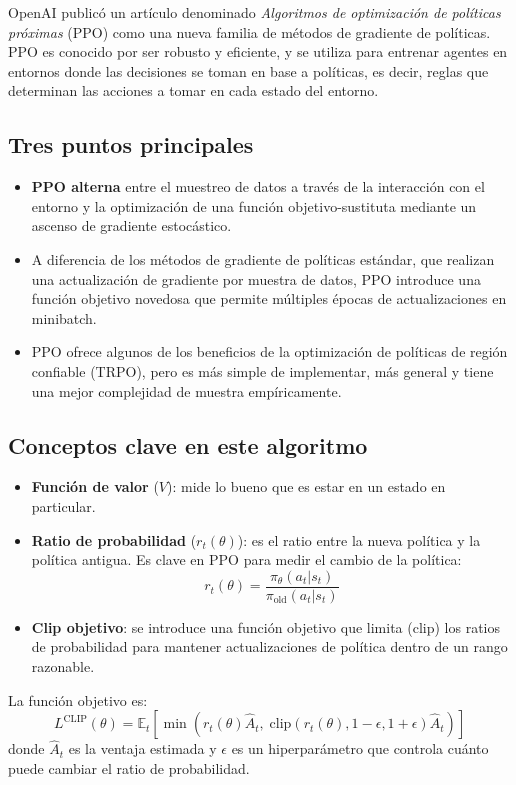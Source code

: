 OpenAI publicó un artículo denominado \textit{Algoritmos de optimización de políticas próximas} (PPO) como una nueva familia de métodos de gradiente de políticas. PPO es conocido por ser robusto y eficiente, y se utiliza para entrenar agentes en entornos donde las decisiones se toman en base a políticas, es decir, reglas que determinan las acciones a tomar en cada estado del entorno.

\subsection{Tres puntos principales}
\begin{itemize}
    \item \textbf{PPO alterna} entre el muestreo de datos a través de la interacción con el entorno y la optimización de una función objetivo-sustituta mediante un ascenso de gradiente estocástico.
    \item A diferencia de los métodos de gradiente de políticas estándar, que realizan una actualización de gradiente por muestra de datos, PPO introduce una función objetivo novedosa que permite múltiples épocas de actualizaciones en minibatch.
    \item PPO ofrece algunos de los beneficios de la optimización de políticas de región confiable (TRPO), pero es más simple de implementar, más general y tiene una mejor complejidad de muestra empíricamente.
\end{itemize}

\subsection{Conceptos clave en este algoritmo}
\begin{itemize}
    \item \textbf{Función de valor} ($V$): mide lo bueno que es estar en un estado en particular.
    \item \textbf{Ratio de probabilidad} ($r_t(\theta)$): es el ratio entre la nueva política y la política antigua. Es clave en PPO para medir el cambio de la política:
    \[
    r_t(\theta) = \frac{\pi_\theta(a_t|s_t)}{\pi_{\text{old}}(a_t|s_t)}
    \]
    \item \textbf{Clip objetivo}: se introduce una función objetivo que limita (clip) los ratios de probabilidad para mantener actualizaciones de política dentro de un rango razonable.
\end{itemize}

La función objetivo es:
\[
L^{\text{CLIP}}(\theta) = \mathbb{E}_t \left[ \min \left( r_t(\theta) \hat{A}_t, \; \text{clip}\left(r_t(\theta), 1 - \epsilon, 1 + \epsilon \right)\hat{A}_t \right) \right]
\]
donde $\hat{A}_t$ es la ventaja estimada y $\epsilon$ es un hiperparámetro que controla cuánto puede cambiar el ratio de probabilidad.

